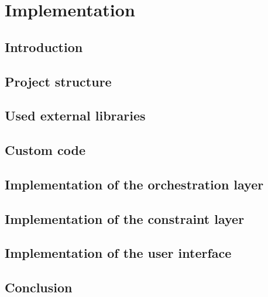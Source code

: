 \chapter{Implementation}

\section{Introduction}

\section{Project structure}

\section{Used external libraries}

\section{Custom code}

\section{Implementation of the orchestration layer}

\section{Implementation of the constraint layer}

\section{Implementation of the user interface}

\section{Conclusion}
